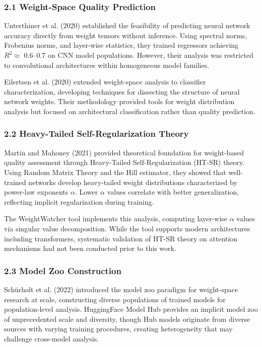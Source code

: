 
\subsubsection{2.1 Weight-Space Quality Prediction}

Unterthiner et al. (2020) established the feasibility of predicting neural network accuracy directly from weight tensors without inference. Using spectral norms, Frobenius norms, and layer-wise statistics, they trained regressors achieving $R^2 \approx$ 0.6--0.7 on CNN model populations. However, their analysis was restricted to convolutional architectures within homogeneous model families.

Eilertsen et al. (2020) extended weight-space analysis to classifier characterization, developing techniques for dissecting the structure of neural network weights. Their methodology provided tools for weight distribution analysis but focused on architectural classification rather than quality prediction.

\subsubsection{2.2 Heavy-Tailed Self-Regularization Theory}

Martin and Mahoney (2021) provided theoretical foundation for weight-based quality assessment through Heavy-Tailed Self-Regularization (HT-SR) theory. Using Random Matrix Theory and the Hill estimator, they showed that well-trained networks develop heavy-tailed weight distributions characterized by power-law exponents $\alpha$. Lower $\alpha$ values correlate with better generalization, reflecting implicit regularization during training.

The WeightWatcher tool \citep{weightwatcher2020} implements this analysis, computing layer-wise $\alpha$ values via singular value decomposition. While the tool supports modern architectures including transformers, systematic validation of HT-SR theory on attention mechanisms had not been conducted prior to this work.

\subsubsection{2.3 Model Zoo Construction}

Schürholt et al. (2022) introduced the model zoo paradigm for weight-space research at scale, constructing diverse populations of trained models for population-level analysis. HuggingFace Model Hub provides an implicit model zoo of unprecedented scale and diversity, though Hub models originate from diverse sources with varying training procedures, creating heterogeneity that may challenge cross-model analysis.

